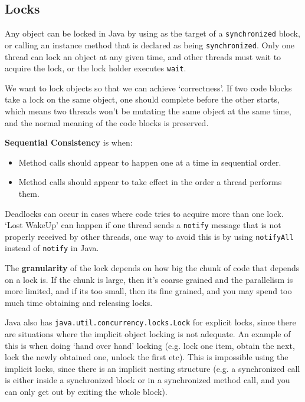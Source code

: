 \subsection{Locks}

Any object can be locked in Java by using as the target of a
\texttt{synchronized} block, or calling an instance method that is declared as
being \texttt{synchronized}. Only one thread can lock an object at any given
time, and other threads must wait to acquire the lock, or the lock holder
executes \texttt{wait}.

We want to lock objects so that we can achieve `correctness'. If two code blocks
take a lock on the same object, one should complete before the other starts,
which means two threads won't be mutating the same object at the same time, and
the normal meaning of the code blocks is preserved.


\textbf{Sequential Consistency} is when:

\begin{itemize}
  \item Method calls should appear to happen one at a time in sequential order.
  \item Method calls should appear to take effect in the order a thread performs
  them.
\end{itemize}

Deadlocks can occur in cases where code tries to acquire more than one lock.
`Lost WakeUp' can happen if one thread sends a \texttt{notify} message that is
not properly received by other threads, one way to avoid this is by using
\texttt{notifyAll} instead of \texttt{notify} in Java.

The \textbf{granularity} of the lock depends on how big the chunk of code that
depends on a lock is. If the chunk is large, then it's coarse grained and the
parallelism is more limited, and if its too small, then its fine grained, and
you may spend too much time obtaining and releasing locks.

Java also has \texttt{java.util.concurrency.locks.Lock} for explicit locks,
since there are situations where the implicit object locking is not adequate. An
example of this is when doing `hand over hand' locking (e.g. lock one item,
obtain the next, lock the newly obtained one, unlock the first etc). This is
impossible using the implicit locks, since there is an implicit nesting structure
(e.g. a synchronized call is either inside a synchronized block or in a
synchronized method call, and you can only get out by exiting the whole block).

